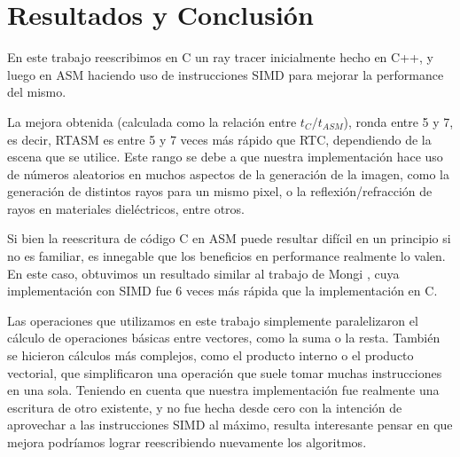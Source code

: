 \newpage
\section{Resultados y Conclusión} \label{sec:conclusion}

En este trabajo reescribimos en C un ray tracer inicialmente hecho en C++, y
luego en ASM haciendo uso de instrucciones SIMD para mejorar la performance del
mismo.

La mejora obtenida (calculada como la relación entre $t_C/t_{ASM}$), ronda entre
5 y 7, es decir, RTASM es entre 5 y 7 veces más rápido que RTC, dependiendo de
la escena que se utilice. Este rango se debe a que nuestra implementación hace
uso de números aleatorios en muchos aspectos de la generación de la imagen, como
la generación de distintos rayos para un mismo pixel, o la reflexión/refracción
de rayos en materiales dieléctricos, entre otros.

Si bien la reescritura de código C en ASM puede resultar difícil en un principio
si no es familiar, es innegable que los beneficios en performance realmente lo
valen. En este caso, obtuvimos un resultado similar al trabajo de Mongi
\cite{rtmartin}, cuya implementación con SIMD fue 6 veces más rápida que la
implementación en C.

Las operaciones que utilizamos en este trabajo simplemente paralelizaron el
cálculo de operaciones básicas entre vectores, como la suma o la resta. También
se hicieron cálculos más complejos, como el producto interno o el producto
vectorial, que simplificaron una operación que suele tomar muchas instrucciones
en una sola. Teniendo en cuenta que nuestra implementación fue realmente una
escritura de otro existente, y no fue hecha desde cero con la intención de
aprovechar a las instrucciones SIMD al máximo, resulta interesante pensar en que
mejora podríamos lograr reescribiendo nuevamente los algoritmos.

%
% 
